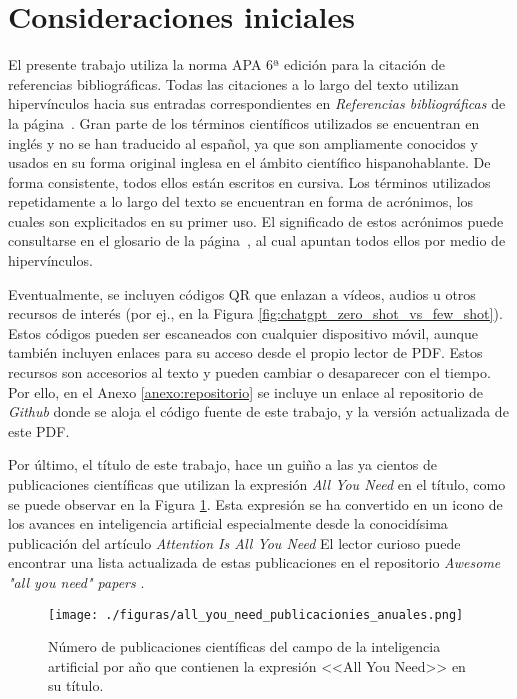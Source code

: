 \section{Consideraciones iniciales}

El presente trabajo utiliza la norma APA 6ª edición para la citación de referencias bibliográficas. Todas las citaciones a lo largo del texto utilizan hipervínculos hacia sus entradas correspondientes en \emph{Referencias bibliográficas} de la página~\pageref{chap:referencias}. Gran parte de los términos científicos utilizados se encuentran en inglés y no se han traducido al español, ya que son ampliamente conocidos y usados en su forma original inglesa en el ámbito científico hispanohablante. De forma consistente, todos ellos están escritos en cursiva. Los términos utilizados repetidamente a lo largo del texto se encuentran en forma de acrónimos, los cuales son explicitados en su primer uso. El significado de estos acrónimos puede consultarse en el glosario de la página~\pageref{chap:glosario}, al cual apuntan todos ellos por medio de hipervínculos.

Eventualmente, se incluyen códigos QR que enlazan a vídeos, audios u otros recursos de interés (por ej., en la Figura \ref{fig:chatgpt_zero_shot_vs_few_shot}). Estos códigos pueden ser escaneados con cualquier dispositivo móvil, aunque también incluyen enlaces para su acceso desde el propio lector de PDF. Estos recursos son accesorios al texto y pueden cambiar o desaparecer con el tiempo. Por ello, en el Anexo \ref{anexo:repositorio} se incluye un enlace al repositorio de \emph{Github} donde se aloja el código fuente de este trabajo, y la versión actualizada de este PDF.

Por último, el título de este trabajo, hace un guiño a las ya cientos de publicaciones científicas que utilizan la expresión \emph{All You Need} en el título, como se puede observar en la Figura \ref{fig:all_you_need_publicaciones}. Esta expresión se ha convertido en un icono de los avances en inteligencia artificial especialmente desde la conocidísima publicación del artículo \emph{Attention Is All You Need} \citep{vaswaniAttentionAllYou2017} El lector curioso puede encontrar una lista actualizada de estas publicaciones en el repositorio \emph{Awesome "all you need" papers} \citep{nishiKentoNishiAwesomeallyouneedpapers2024}.


\begin{figure}[H]
    \caption[Número de publicaciones científicas del campo de la inteligencia artificial por año que contienen la expresión <<All You Need>> en su título]{Número de publicaciones científicas del campo de la inteligencia artificial por año que contienen la expresión <<All You Need>> en su título.}
    \centering
    \texttt{[image: ./figuras/all\_you\_need\_publicacionies\_anuales.png]}
    \label{fig:all_you_need_publicaciones}
\end{figure}


